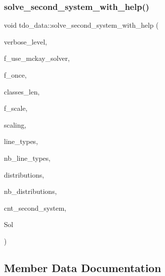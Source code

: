 \subsubsection{\texorpdfstring{solve\+\_\+second\+\_\+system\+\_\+with\+\_\+help()}{solve\_second\_system\_with\_help()}}
{\footnotesize\ttfamily void tdo\+\_\+data\+::solve\+\_\+second\+\_\+system\+\_\+with\+\_\+help (\begin{DoxyParamCaption}\item[{\mbox{\hyperlink{galois_8h_a09fddde158a3a20bd2dcadb609de11dc}{I\+NT}}}]{verbose\+\_\+level,  }\item[{\mbox{\hyperlink{galois_8h_a09fddde158a3a20bd2dcadb609de11dc}{I\+NT}}}]{f\+\_\+use\+\_\+mckay\+\_\+solver,  }\item[{\mbox{\hyperlink{galois_8h_a09fddde158a3a20bd2dcadb609de11dc}{I\+NT}}}]{f\+\_\+once,  }\item[{\mbox{\hyperlink{galois_8h_a09fddde158a3a20bd2dcadb609de11dc}{I\+NT}} $\ast$}]{classes\+\_\+len,  }\item[{\mbox{\hyperlink{galois_8h_a09fddde158a3a20bd2dcadb609de11dc}{I\+NT}}}]{f\+\_\+scale,  }\item[{\mbox{\hyperlink{galois_8h_a09fddde158a3a20bd2dcadb609de11dc}{I\+NT}}}]{scaling,  }\item[{\mbox{\hyperlink{galois_8h_a09fddde158a3a20bd2dcadb609de11dc}{I\+NT}} $\ast$\&}]{line\+\_\+types,  }\item[{\mbox{\hyperlink{galois_8h_a09fddde158a3a20bd2dcadb609de11dc}{I\+NT}} \&}]{nb\+\_\+line\+\_\+types,  }\item[{\mbox{\hyperlink{galois_8h_a09fddde158a3a20bd2dcadb609de11dc}{I\+NT}} $\ast$\&}]{distributions,  }\item[{\mbox{\hyperlink{galois_8h_a09fddde158a3a20bd2dcadb609de11dc}{I\+NT}} \&}]{nb\+\_\+distributions,  }\item[{\mbox{\hyperlink{galois_8h_a09fddde158a3a20bd2dcadb609de11dc}{I\+NT}}}]{cnt\+\_\+second\+\_\+system,  }\item[{\mbox{\hyperlink{structsolution__file__data}{solution\+\_\+file\+\_\+data}} $\ast$}]{Sol }\end{DoxyParamCaption})}



\subsection{Member Data Documentation}
\mbox{\label{classtdo__data_abf12b65f913a5c714085f198989e0d45}} 
